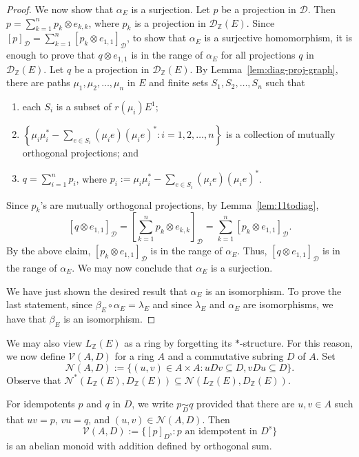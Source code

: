 \documentclass[11pt, letterpaper,final]{amsart}
\newcommand{\ZZ}{\mathbb{Z}}
\newcommand{\V}{\mathcal{V}}
\newcommand{\D}{\mathcal{D}}
\newcommand{\N}{\mathcal{N}}
\theoremstyle{definition}
\theoremstyle{remark}
\begin{document}
\begin{proof}
We now show that $\alpha_E$ is a surjection.  Let $p$ be a projection in $\D$.  Then $p = \sum_{ k = 1}^n p_k \otimes e_{k,k}$, where $p_k$ is a projection in $\D_\ZZ(E)$.  Since $[p]_{ \D } = \sum_{ k = 1}^n [ p_k \otimes e_{1,1} ]_{ \D }$, to show that $\alpha_E$ is a surjective homomorphism, it is enough to prove that $q \otimes e_{1,1}$ is in the range of $\alpha_E$ for all projections $q$ in $\D_\ZZ(E)$.  Let $q$ be a projection in $\D_\ZZ(E)$.  By Lemma~\ref{lem:diag-proj-graph}, there are paths $\mu_1, \mu_2, \ldots, \mu_n$ in $E$ and finite sets $S_1, S_2, \ldots, S_n$ such that 
\begin{enumerate}
    \item each $S_i$ is a subset of $r(\mu_i)E^1$;

    \item $\left\{\mu_i \mu_i^* - \sum_{ e \in S_i } (\mu_i e)(\mu_i e)^* : i =1, 2, \ldots, n \right\}$ is a collection of mutually orthogonal projections; and 

    \item $q = \sum_{ i = 1}^n p_i$, where $p_i := \mu_i \mu_i^* - \sum_{ e \in S_i } (\mu_i e)(\mu_i e)^*$.
\end{enumerate}
Since $p_k$'s are mutually orthogonal projections, by Lemma~\ref{lem:11todiag}, 
$$[q \otimes e_{1,1} ]_{ \D } = \left[ \sum_{ k = 1}^n p_k \otimes  e_{k,k} \right]_{ \D } = \sum_{ k = 1}^n [ p_k \otimes  e_{1,1} ]_{ \D }.$$
By the above claim, $[ p_k \otimes  e_{1,1} ]_{ \D }$ is in the range of $\alpha_E$.  Thus, $[q \otimes e_{1,1} ]_{ \D }$ is in the range of $\alpha_E$.  We may now conclude that $\alpha_E$ is a surjection.

We have just shown the desired result that $\alpha_E$ is an isomorphism.  To prove the last statement, since $\beta_E \circ \alpha_E = \lambda_E$ and since $\lambda_E$ and $\alpha_E$ are isomorphisms, we have that $\beta_E$ is an isomorphism.
\end{proof}


We may also view $L_\ZZ(E)$ as a ring by forgetting its $*$-structure.  For this reason, we now define $\V(A,D)$ for a ring $A$ and a commutative subring $D$ of $A$.  Set 
\[
\N(A, D) := \{ (u,v) \in A \times A : u Dv \subseteq D, v Du \subseteq D \}.
\]
Observe that $\N^*(L_\ZZ(E), D_\ZZ(E)) \subseteq \N(L_\ZZ(E), D_\ZZ(E))$.

For idempotents $p$ and $q$ in $D$, we write $p \underset{D}{\sim} q$ provided that there are $u, v \in A$ such that $uv = p$, $vu = q$, and $(u,v) \in \N(A,D)$.  Then
\[
\V(A, D) := \{ [p]_{D^s} : p \text{ an idempotent in } D^s \}
\]
is an abelian monoid with addition defined by orthogonal sum.
\end{document}
